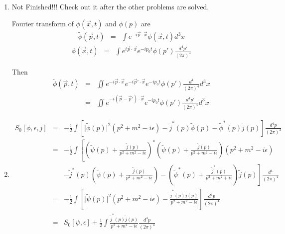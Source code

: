 \documentclass[12pt,a4paper]{article}
\begin{document}
\begin{enumerate}
\item

{\color{red} Not Finished!!! Check out it after the other problems are solved.}

Fourier transform of $\phi(\vec x,t)$ and $\phi(p)$ are
\begin{eqnarray*}
	\tilde \phi(\vec p,t) &=& \int e^{-i\vec p\cdot \vec x} \phi(\vec x,t) d^3 x
\end{eqnarray*}
\begin{eqnarray*}
	\phi(\vec x,t) &=& \int e^{i\vec p\cdot \vec x} e^{-ip_0 t}\phi(p')\frac{d^4 p'}{(2\pi)^4}
\end{eqnarray*}

Then
\begin{eqnarray*}
	\tilde \phi(\vec p,t)&=& \iint e^{-i\vec p\cdot \vec x} e^{-i \vec p'\cdot\vec x}e^{-i p_0 t} \phi(p') \frac{d^4}{(2\pi)^4} d^3 x \\
	&=& \iint e^{-i(\vec p - \vec p')\cdot \vec x}e^{-ip_0 t} \phi(p') \frac{d^4p'}{(2\pi)^4} d^3 x
\end{eqnarray*}





\item

\begin{eqnarray*}
	S_0 [\phi,\epsilon,j]&=& -\frac12 \int \left[ \vert \tilde \phi(p) \vert^2 (p^2 + m^2 -i\epsilon) - \tilde j^*(p)\tilde\phi(p) - \tilde \phi^*(p)\tilde j(p) \right]\frac{d^4 p}{(2\pi)^4} \\
	&=& -\frac12 \int\left[ \left(\tilde \psi(p) + \frac{\tilde j(p)}{p^2 + m^2 - i\epsilon}\right)^* \left(\tilde \psi(p) + \frac{\tilde j(p)}{p^2 + m^2 - i\epsilon}\right) \left(p^2+m^2-i\epsilon\right) \right.\\
	&&\left. - \tilde j^*(p)\left(\tilde \psi(p) + \frac{\tilde j(p)}{p^2 + m^2 - i\epsilon}\right) - \left( \tilde\psi^*(p) + \frac{\tilde j^*(p)}{p^2+m^2+i\epsilon} \right)\tilde j(p) \right]\frac{d^4}{(2\pi)^4} \\
	&=& -\frac12 \int\left[ \vert \tilde \psi(p)\vert^2 (p^2 + m^2 - i\epsilon ) - \frac{\tilde j^*(p) \tilde j(p) }{ p^2 +m^2 -i\epsilon} \right] \frac{d^4p}{(2\pi)^4} \\
	&=& S_0[\psi,\epsilon] + \frac12 \int\frac{\tilde j^* (p) \tilde j(p)}{p^2 + m^2 - i\epsilon} \frac{d^4p}{(2\pi)^4}
\end{eqnarray*}




\end{enumerate}
\end{document}
